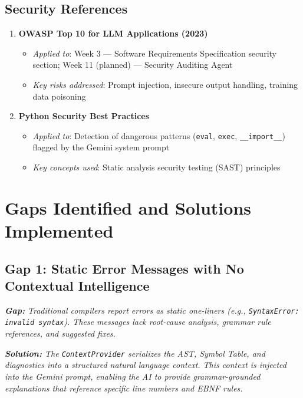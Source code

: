 \documentclass[a4paper,11pt]{article}
\newcommand{\gap}[1]{\textit{\textbf{Gap:} #1}}
\newcommand{\solution}[1]{\textit{\textbf{Solution:} #1}}
\begin{document}
\subsection{Security References}

\begin{enumerate}
    \item \textbf{OWASP Top 10 for LLM Applications (2023)}
    \begin{itemize}
        \item \textit{Applied to}: Week 3 --- Software Requirements Specification security section; Week 11 (planned) --- Security Auditing Agent
        \item \textit{Key risks addressed}: Prompt injection, insecure output handling, training data poisoning
    \end{itemize}

    \item \textbf{Python Security Best Practices}
    \begin{itemize}
        \item \textit{Applied to}: Detection of dangerous patterns (\texttt{eval}, \texttt{exec}, \texttt{\_\_import\_\_}) flagged by the Gemini system prompt
        \item \textit{Key concepts used}: Static analysis security testing (SAST) principles
    \end{itemize}
\end{enumerate}


\section{Gaps Identified and Solutions Implemented}

\subsection{Gap 1: Static Error Messages with No Contextual Intelligence}

\gap{Traditional compilers report errors as static one-liners (e.g., \texttt{SyntaxError: invalid syntax}). These messages lack root-cause analysis, grammar rule references, and suggested fixes.}

\solution{The \texttt{ContextProvider} serializes the AST, Symbol Table, and diagnostics into a structured natural language context. This context is injected into the Gemini prompt, enabling the AI to provide grammar-grounded explanations that reference specific line numbers and EBNF rules.}
\end{document}
